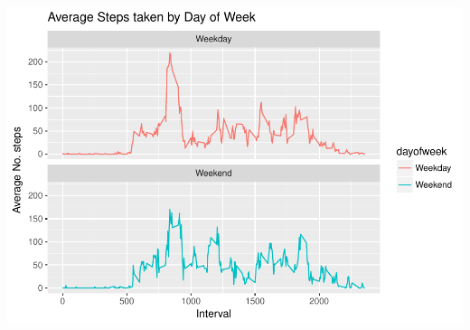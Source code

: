 \documentclass[]{article}
\begin{document}
\includegraphics{PA1_template_files/figure-latex/unnamed-chunk-14-1.pdf}
\end{document}
